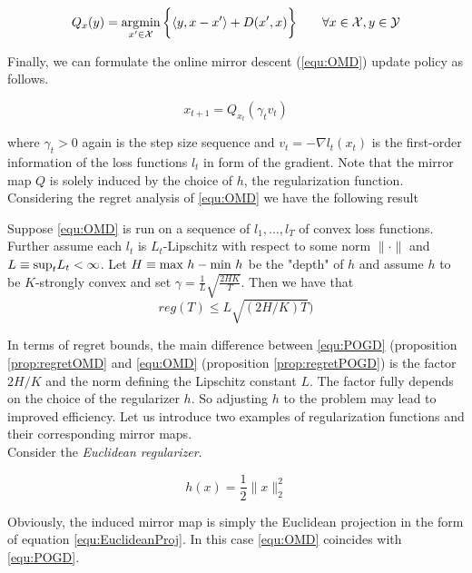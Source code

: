 \begin{equation*}
    Q_x(y) = \operatorname*{\arg\!\min}_{x'\in \mathcal{X}}\bigg\{\langle y,x-x'\rangle + D(x',x)\bigg\} \qquad \forall x\in \mathcal{X}, y \in \mathcal{Y}
\end{equation*}

Finally, we can formulate the online mirror descent (\ref{equ:OMD}) update policy as follows.

\begin{equation*}
    \tag{OMD}
    x_{t+1} = Q_{x_t}(\gamma_t v_t)
    \label{equ:OMD}
\end{equation*}

where $\gamma_t > 0$ again is the step size sequence and $v_t = -\nabla l_t(x_t)$ is the first-order information of the loss functions $l_t$ in form of the gradient. Note that the mirror map $Q$ is solely induced by the choice of $h$, the regularization function. Considering the regret analysis of \ref{equ:OMD} we have the following result \cite[Theorem 2.4]{HDRmertikopoulos}

\begin{proposition}\label{prop:regretOMD}
    Suppose \ref{equ:OMD} is run on a sequence of $l_1,\dots,l_T$ of convex loss functions. Further assume each $l_t$ is $L_t$-Lipschitz with respect to some norm $\|\cdot\|$ and $L \equiv \textnormal{sup}_t L_t < \infty$. Let $H \equiv \textnormal{max } h-\textnormal{min } h$ be the "depth" of $h$ and assume $h$ to be $K$-strongly convex and set $\gamma = \frac{1}{L}\sqrt{\frac{2HK}{T}}$. Then we have that
    \[reg(T) \le L\sqrt{(2H/K)T})\]
\end{proposition}

In terms of regret bounds, the main difference between \ref{equ:POGD} (proposition \ref{prop:regretOMD} and \ref{equ:OMD} (proposition \ref{prop:regretPOGD}) is the factor $2H/K$ and the norm defining the Lipschitz constant $L$. The factor fully depends on the choice of the regularizer $h$. So adjusting $h$ to the problem may lead to improved efficiency. Let us introduce two examples of regularization functions and their corresponding mirror maps. \\

Consider the \textit{Euclidean regularizer}.

\begin{equation*}
    h(x) = \frac{1}{2}\|x\|_2^2
\end{equation*}

Obviously, the induced mirror map is simply the Euclidean projection in the form of equation \ref{equ:EuclideanProj}. In this case \ref{equ:OMD} coincides with \ref{equ:POGD}. 

